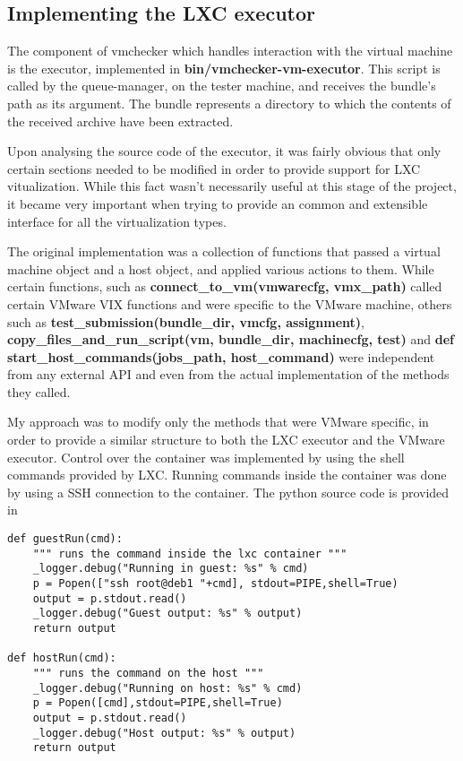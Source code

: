 \subsection{Implementing the LXC executor}
\label{sub-sec:vmc-lxc-executor}

The component of vmchecker which handles interaction with the virtual machine 
is the executor, implemented in \textbf{bin/vmchecker-vm-executor}. This script
is called by the queue-manager, on the tester machine, and receives the bundle's
path as its argument. The bundle represents a directory to which the contents
of the received archive have been extracted.

Upon analysing the source code of the executor, it was fairly obvious that
only certain sections needed to be modified in order to provide support for
LXC vitualization. While this fact wasn't necessarily useful at this stage
of the project, it became very important when trying to provide an common and
extensible interface for all the virtualization types.

The original implementation was a collection of functions that passed a 
virtual machine object and a host object, and applied various actions to them.
While certain functions, such as \textbf{connect_to_vm(vmwarecfg, vmx_path)}
called certain VMware VIX functions and were specific to the VMware machine,
others such as \textbf{test_submission(bundle_dir, vmcfg, assignment)}, 
\textbf{copy_files_and_run_script(vm, bundle_dir, machinecfg, test)} and 
\textbf{def start_host_commands(jobs_path, host_command)} were independent
from any external API and even from the actual implementation of the 
methods they called.

My approach was to modify only the methods that were VMware specific, in order
to provide a similar structure to both the LXC executor and the VMware executor.
Control over the container was implemented by using the shell commands
provided by LXC. Running commands inside the container was done by using a 
SSH connection to the container. The python source code is 
provided in 

\lstset{caption=Running commands,language=python,label=lst:lxc-commands}
\begin{lstlisting}
def guestRun(cmd):
    """ runs the command inside the lxc container """
    _logger.debug("Running in guest: %s" % cmd)
    p = Popen(["ssh root@deb1 "+cmd], stdout=PIPE,shell=True)
    output = p.stdout.read()
    _logger.debug("Guest output: %s" % output)
    return output

def hostRun(cmd):
    """ runs the command on the host """
    _logger.debug("Running on host: %s" % cmd)
    p = Popen([cmd],stdout=PIPE,shell=True)
    output = p.stdout.read()
    _logger.debug("Host output: %s" % output)
    return output
\end{lstlisting}

